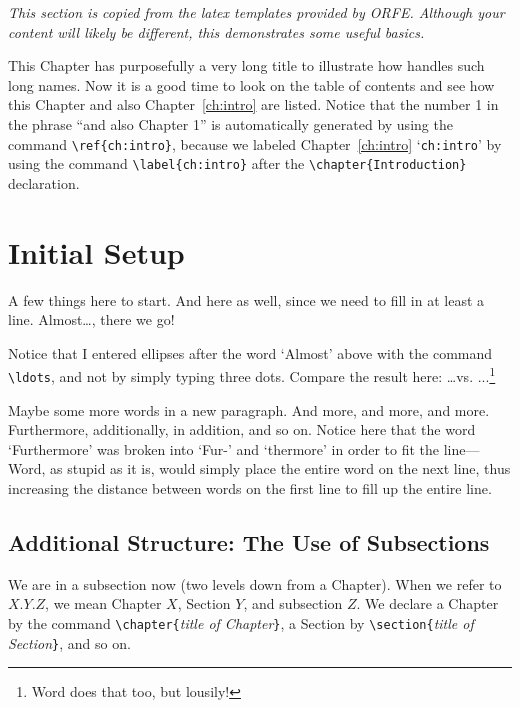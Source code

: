 
\emph{This section is copied from the latex templates provided by ORFE. Although your content will likely be different, this demonstrates some useful basics.}

This Chapter has purposefully a very long title to illustrate how
\LaTeXe{} handles such long names. Now it is a good time to look on
the table of contents and see how this Chapter and also
Chapter~\ref{ch:intro} are listed. Notice that the number 1 in the
phrase ``and also Chapter 1'' is automatically generated by using
the command \verb|\ref{ch:intro}|, because we labeled
Chapter~\ref{ch:intro} `\verb|ch:intro|' by using the command
\verb|\label{ch:intro}| after the \verb|\chapter{Introduction}|
declaration.

\section{Initial Setup}
A few things here to start. And here as well, since we need to fill
in at least a line. Almost\ldots, there we go!

Notice that I entered ellipses after the word `Almost' above with
the command \verb|\ldots|, and not by simply typing three dots.
Compare the result here: \ldots vs. ...\footnote{Word does that too,
but lousily!}

Maybe some more words in a new paragraph. And more, and more, and
more. Furthermore, additionally, in addition, and so on. Notice here
that the word `Furthermore' was broken into `Fur-' and `thermore' in
order to fit the line---Word, as stupid as it is, would simply place
the entire word on the next line, thus increasing the distance
between words on the first line to fill up the entire line.

\subsection{Additional Structure: The Use of Subsections}
\label{sec:structure} We are in a subsection now (two levels down
from a Chapter). When we refer to $X.Y.Z$, we mean Chapter $X$,
Section $Y$, and subsection $Z$. We declare a Chapter by the command
\verb|\chapter{|\emph{title of Chapter}\verb|}|, a Section by
\verb|\section{|\emph{title of Section}\verb|}|, and so on.

